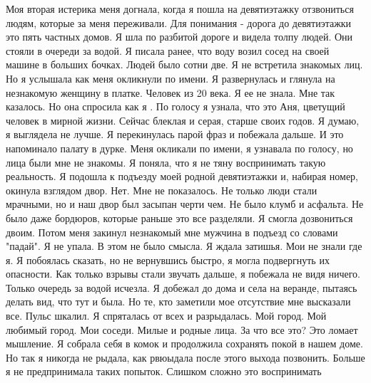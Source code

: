 Моя вторая истерика меня догнала, когда я пошла на девятиэтажку отзвониться
людям, которые за меня переживали. Для понимания - дорога до девятиэтажки это
пять частных домов. Я шла по разбитой дороге и видела толпу людей. Они стояли в
очереди за водой. Я писала ранее, что воду возил сосед на своей машине в
больших бочках. Людей было сотни две. Я не встретила знакомых лиц. Но я
услышала как меня окликнули по имени. Я развернулась и глянула на незнакомую
женщину в платке. Человек из 20 века. Я ее не знала. Мне так казалось. Но она
спросила как я . По голосу я узнала, что это Аня, цветущий человек в мирной
жизни. Сейчас блеклая и серая, старше своих годов. Я думаю, я выглядела не
лучше. Я перекинулась парой фраз и побежала дальше. И это напоминало палату в
дурке. Меня окликали по имени, я узнавала по голосу, но лица были мне не
знакомы. Я поняла, что я не тяну воспринимать такую реальность. Я подошла к
подъезду моей родной девятиэтажки и, набирая номер, окинула взглядом двор. Нет.
Мне не показалось. Не только люди стали мрачными, но и наш двор был засыпан
черти чем. Не было клумб и асфальта. Не было даже бордюров, которые раньше это
все разделяли. Я смогла дозвониться двоим. Потом меня закинул незнакомый мне
мужчина в подъезд со словами "падай". Я не упала. В этом не было смысла. Я
ждала затишья. Мои не знали где я. Я побоялась сказать, но не вернувшись
быстро, я могла подвергнуть их опасности. Как только взрывы стали звучать
дальше, я побежала не видя ничего. Только очередь за водой исчезла. Я добежал
до дома и села на веранде, пытаясь делать вид, что тут и была. Но те, кто
заметили мое отсутствие мне высказали все. Пульс шкалил. Я спряталась от всех и
разрыдалась. Мой город. Мой любимый город. Мои соседи. Милые и родные лица. За
что все это? Это ломает мышление. Я собрала себя в комок и продолжила сохранять
покой в нашем доме. Но так я никогда не рыдала, как рвюыдала после этого выхода
позвонить. Больше я не предпринимала таких попыток. Слишком сложно это
воспринимать

